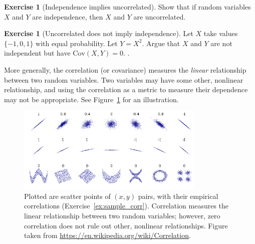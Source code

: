 \documentclass[11pt]{article}
\theoremstyle{definition}
\newtheorem{exercise}[]{Exercise}
\newcommand{\cov}{\text{Cov}}
\begin{document}
\begin{exercise}[Independence implies uncorrelated]
Show that if random variables $X$ and $Y$ are independence,
then $X$ and $Y$ are uncorrelated.
\label{ex:indep_corr}
\end{exercise}

\begin{exercise}[Uncorrelated does not imply independence]
  Let $X$ take values $\{-1, 0, 1\}$ with equal probability.
  Let $Y = X^2$.
  Argue that $X$ and $Y$ are not independent but
  have $\cov(X, Y) = 0$. .
\end{exercise}

More generally, the correlation (or covariance) measures
the \textit{linear} relationship between two random
variables.
Two variables may have some other, nonlinear
relationship, and using the correlation
as a metric to measure their dependence
may not be appropriate.
See Figure~\ref{fig:wiki_corr} for an illustration.

\begin{figure}[!h]
  \centering
  \includegraphics[width = 0.8\textwidth]{./figures/wiki_corr_example.png}
  \caption{Plotted are scatter points of
  $(x,y)$ pairs, with their empirical correlations
  (Exercise~\ref{ex:sample_corr}). Correlation measures the linear relationship
  between two random variables; however, zero correlation
  does not rule out other, nonlinear relationships.
  Figure taken from \url{https://en.wikipedia.org/wiki/Correlation}.}
  \label{fig:wiki_corr}
\end{figure}
\end{document}
